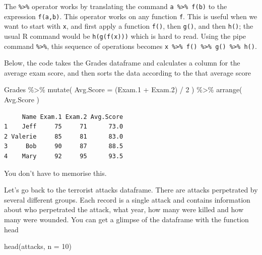 \documentclass[
  letterpaper,
  DIV=11,
  numbers=noendperiod]{scrreprt}
\newenvironment{Shaded}{\begin{snugshade}}{\end{snugshade}}
\newcommand{\AttributeTok}[1]{\textcolor[rgb]{0.40,0.45,0.13}{#1}}
\newcommand{\DecValTok}[1]{\textcolor[rgb]{0.68,0.00,0.00}{#1}}
\newcommand{\FloatTok}[1]{\textcolor[rgb]{0.68,0.00,0.00}{#1}}
\newcommand{\FunctionTok}[1]{\textcolor[rgb]{0.28,0.35,0.67}{#1}}
\newcommand{\NormalTok}[1]{\textcolor[rgb]{0.00,0.23,0.31}{#1}}
\newcommand{\SpecialCharTok}[1]{\textcolor[rgb]{0.37,0.37,0.37}{#1}}
\begin{document}
The \texttt{\%\textgreater{}\%} operator works by translating the
command \texttt{a\ \%\textgreater{}\%\ f(b)} to the expression
\texttt{f(a,b)}. This operator works on any function \texttt{f}. This is
useful when we want to start with \texttt{x}, and first apply a function
\texttt{f()}, then \texttt{g()}, and then \texttt{h()}; the usual R
command would be \texttt{h(g(f(x)))} which is hard to read. Using the
pipe command \texttt{\%\textgreater{}\%}, this sequence of operations
becomes
\texttt{x\ \%\textgreater{}\%\ f()\ \%\textgreater{}\%\ g()\ \%\textgreater{}\%\ h()}.

Below, the code takes the Grades dataframe and calculates a column for
the average exam score, and then sorts the data according to the that
average score

\begin{Shaded}
\begin{Highlighting}[]
\NormalTok{Grades }\SpecialCharTok{\%\textgreater{}\%}   \FunctionTok{mutate}\NormalTok{( }\AttributeTok{Avg.Score =}\NormalTok{ (Exam}\FloatTok{.1} \SpecialCharTok{+}\NormalTok{ Exam}\FloatTok{.2}\NormalTok{) }\SpecialCharTok{/} \DecValTok{2}\NormalTok{ ) }\SpecialCharTok{\%\textgreater{}\%}   \FunctionTok{arrange}\NormalTok{( Avg.Score )}
\end{Highlighting}
\end{Shaded}

\begin{verbatim}
     Name Exam.1 Exam.2 Avg.Score
1    Jeff     75     71      73.0
2 Valerie     85     81      83.0
3     Bob     90     87      88.5
4    Mary     92     95      93.5
\end{verbatim}

You don't have to memorise this.

Let's go back to the terrorist attacks dataframe. There are attacks
perpetrated by several different groups. Each record is a single attack
and contains information about who perpetrated the attack, what year,
how many were killed and how many were wounded. You can get a glimpse of
the dataframe with the function head

\begin{Shaded}
\begin{Highlighting}[]
\FunctionTok{head}\NormalTok{(attacks, }\AttributeTok{n =} \DecValTok{10}\NormalTok{)}
\end{Highlighting}
\end{Shaded}
\end{document}
